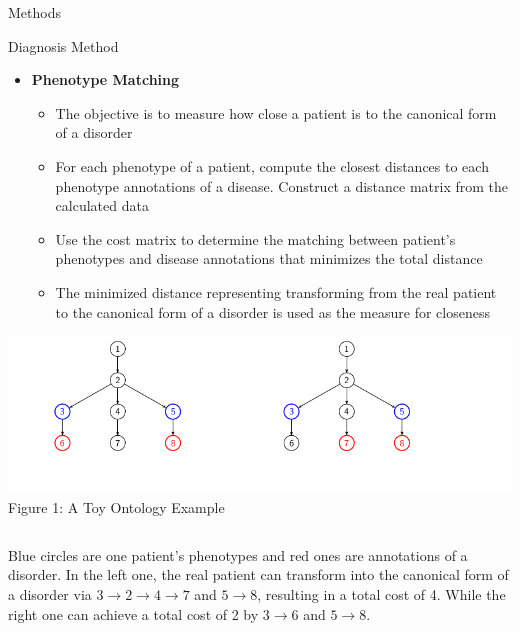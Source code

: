 \documentclass[final]{beamer} %
\begin{document}
\begin{frame}{}
\begin{columns}[T]
\begin{column}{0.3\linewidth}
\begin{block}{\Huge Methods}
\begin{block}{\LARGE Diagnosis Method}
\begin{itemize}
    \item
    \LARGE \textbf{Phenotype Matching}
     \begin{itemize}
     \Large
     \item
     The objective is to measure how close a patient is to the canonical form of a disorder
     \vspace{1cm}
     \item
     For each phenotype of a patient, compute the closest distances to each phenotype annotations of a disease. Construct a distance matrix from the calculated data
     \vspace{1cm}
    \item
    Use the cost matrix to determine the matching between patient's phenotypes and disease annotations that minimizes the total distance
     \vspace{1cm}
    \item
    The minimized distance representing transforming from the real patient to the canonical form of a disorder is used as the measure for closeness
         \end{itemize}
  \end{itemize}
   \vspace{3cm}
   \begin{center}
   \includegraphics[width=.9\textwidth]{toy_ontology}
   \\
   \normalsize
   Figure 1: A Toy Ontology Example
   \end{center}
   \begin{columns}[T]
   \begin{column}{.9\textwidth}
   \large
Blue circles are one patient's phenotypes and red ones are annotations of a disorder. In the left one, the real patient can transform into the canonical form of a disorder via $3 \rightarrow 2 \rightarrow 4 \rightarrow 7$ and $5 \rightarrow 8$, resulting in a total cost of 4. While the right one can achieve a total cost of 2 by $3 \rightarrow 6$ and $5 \rightarrow 8$.
   \end{column}
   \end{columns}
     \end{block}
    \end{block}


\end{column}
\end{columns}
\end{frame}
\end{document}
